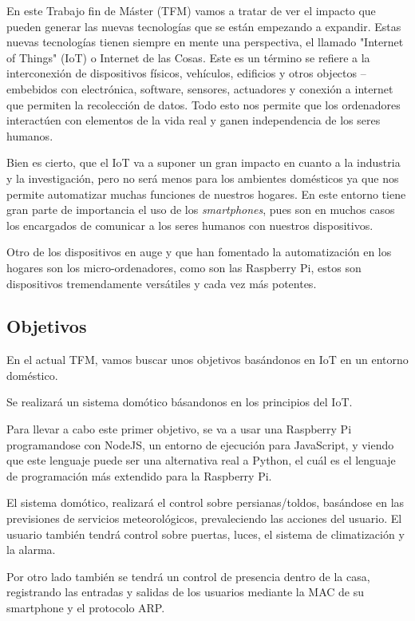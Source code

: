 \documentclass[10pt,journal,compsoc]{IEEEtran}
\begin{document}
\IEEEPARstart En este Trabajo fin de Máster (TFM) vamos a tratar de ver el impacto 
que pueden generar las nuevas tecnologías que se están empezando a expandir.
Estas nuevas tecnologías tienen siempre en mente una perspectiva, el llamado
 "Internet of Things" (IoT) o Internet de las Cosas. 
Este es un término se refiere a la interconexión de dispositivos físicos, vehículos, edificios 
y otros objectos --embebidos con electrónica, software, sensores, actuadores y conexión a 
internet que permiten la recolección de datos.
Todo esto nos permite que los ordenadores interactúen con elementos de la vida real y ganen 
independencia de los seres humanos.

Bien es cierto, que el IoT va a suponer un gran impacto en cuanto a la industria y la investigación,
 pero no será menos para los ambientes domésticos ya que nos permite automatizar muchas funciones 
 de nuestros hogares.
En este entorno tiene gran parte de importancia el uso de los \textit{smartphones}, pues son en 
muchos casos los encargados de comunicar a los seres humanos con nuestros dispositivos.

Otro de los dispositivos en auge y que han fomentado la automatización en los hogares son los 
micro-ordenadores, como son las Raspberry Pi, estos son dispositivos tremendamente versátiles 
y cada vez más potentes.


\subsection{Objetivos}
En el actual TFM, vamos buscar unos objetivos basándonos en IoT en un entorno doméstico.

Se realizará un sistema domótico básandonos en los principios del IoT.

Para llevar a cabo este primer objetivo, se va a usar una Raspberry Pi programandose con NodeJS, 
un entorno de ejecución para JavaScript, y viendo que este lenguaje puede ser una alternativa real a 
Python, el cuál es el lenguaje de programación más extendido para la Raspberry Pi.

El sistema domótico, realizará el control sobre persianas/toldos, basándose en las previsiones 
de servicios meteorológicos, prevaleciendo las acciones del usuario. El usuario también tendrá 
control sobre puertas, luces, el sistema de climatización y la alarma.

Por otro lado también se tendrá un control de presencia dentro de la casa, registrando las 
entradas y salidas de los usuarios mediante la MAC de su smartphone y el protocolo ARP. 
\end{document}
